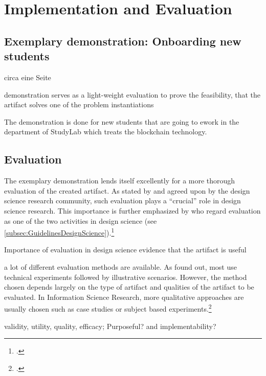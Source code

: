 \chapter{Implementation and Evaluation}

\section{Exemplary demonstration: Onboarding new students} \label{sec:demo}
circa eine Seite

demonstration serves as a light-weight evaluation to prove the feasibility, that the artifact solves one of the problem instantiations

The demonstration is done for new students that are going to ework in the department of StudyLab which treats the blockchain technology. 

\section{Evaluation} \label{sec:Evaluation}

The exemplary demonstration lends itself excellently for a more thorough evaluation of the created artifact. As stated by \cite{HevnerDesignScienceResearch2004} and agreed upon by the design science research community, such evaluation plays a \enquote{crucial} role in design science research. This importance is further emphasized by \cite{MarchDesignnaturalscience1995} who regard evaluation as one of the two activities in design science (see \ref{subsec:GuidelinesDesignScience}).\footcites[Cf.][p.258]{MarchDesignnaturalscience1995}[Cf. in addition][]{PfeffersDesignScienceResearch2007}{HevnerDesignScienceResearch2004}{Pries-HejeComprehensiveFrameworkEvaluation2012}{Pries-HejeStrategiesDesignScience} 

Importance of evaluation in design science 
evidence that the artifact is useful

a lot of different evaluation methods are available. As \cite{PfeffersDesignScienceResearch2012} found out, most use technical experiments followed by illustrative scenarios. However, the method chosen depends largely on the type of artifact and qualities of the artifact to be evaluated. In Information Science Research, more qualitative approaches are usually chosen such as case studies or subject based experiments.\footcites[Cf.][p.4 et seq]{PfeffersDesignScienceResearch2012} 

validity, utility, quality, efficacy; Purposeful? and implementability?

